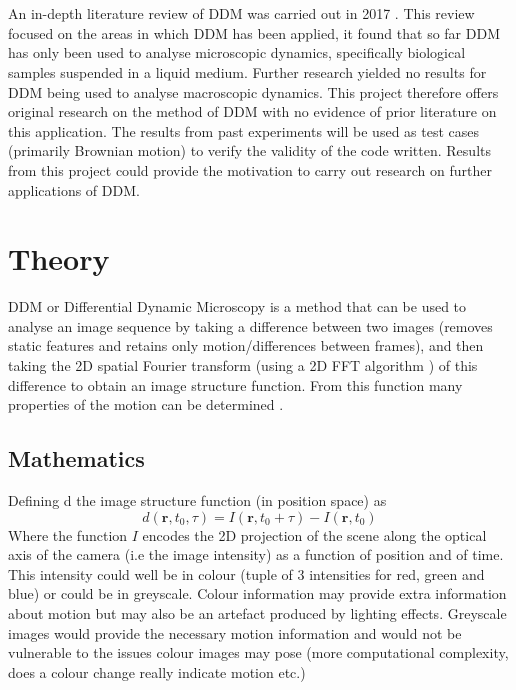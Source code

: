 \documentclass[11pt]{article}
\begin{document}
\\\\
An in-depth literature review of DDM was carried out in 2017 \cite{ddm1}. This review focused on the areas in which DDM has been applied, it found that so far DDM has only been used to analyse microscopic dynamics, specifically biological samples suspended in a liquid medium. Further research yielded no results for DDM being used to analyse macroscopic dynamics. This project therefore offers original research on the method of DDM with no evidence of prior literature on this application. The results from past experiments will be used as test cases (primarily Brownian motion) to verify the validity of the code written. Results from this project could provide the motivation to carry out research on further applications of DDM.

\clearpage
\section{Theory}
\label{section:theory}
DDM or Differential Dynamic Microscopy is a method that can be used to analyse an image sequence by taking a difference between two images (removes static features and retains only motion/differences between frames), and then taking the 2D spatial Fourier transform (using a 2D FFT algorithm \cite{fft}) of this difference to obtain an image structure function.
From this function many properties of the motion can be determined \cite{ddm1}.

\subsection{Mathematics}
Defining d the image structure function (in position space) as
\begin{equation}
    d(\textbf{r}, t_0, \tau) = I(\mathbf{r}, t_0 + \tau) - I(\mathbf{r}, t_0)
\end{equation}
Where the function $\textit{I}$ encodes the 2D projection of the scene along the optical axis of the camera (i.e the image intensity) as a function of position and of time.
This intensity could well be in colour (tuple of 3 intensities for red, green and blue) or could be in greyscale. Colour information may provide extra information about motion but may also be an artefact produced by lighting effects. Greyscale images would provide the necessary motion information and would not be vulnerable to the issues colour images may pose (more computational complexity, does a colour change really indicate motion etc.)
\end{document}
